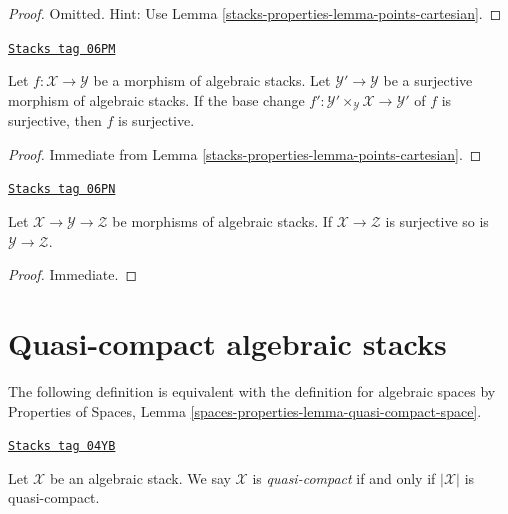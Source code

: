 \begin{proof}
Omitted. Hint: Use
Lemma \ref{stacks-properties-lemma-points-cartesian}.
\end{proof}

\begin{lemma}
\label{stacks-properties-lemma-descent-surjective}
\href{https://stacks.math.columbia.edu/tag/06PM}{\texttt{Stacks tag 06PM}}

Let $f : \mathcal{X} \to \mathcal{Y}$ be a morphism of algebraic stacks.
Let $\mathcal{Y}' \to \mathcal{Y}$ be a surjective morphism of algebraic
stacks. If the base change $f' : \mathcal{Y}' \times_\mathcal{Y} \mathcal{X}
\to \mathcal{Y}'$ of $f$ is surjective, then $f$ is surjective.
\end{lemma}

\begin{proof}
Immediate from
Lemma \ref{stacks-properties-lemma-points-cartesian}.
\end{proof}

\begin{lemma}
\label{stacks-properties-lemma-surjective-permanence}
\href{https://stacks.math.columbia.edu/tag/06PN}{\texttt{Stacks tag 06PN}}

Let $\mathcal{X} \to \mathcal{Y} \to \mathcal{Z}$ be morphisms of
algebraic stacks. If $\mathcal{X} \to \mathcal{Z}$ is surjective
so is $\mathcal{Y} \to \mathcal{Z}$.
\end{lemma}

\begin{proof}
Immediate.
\end{proof}

\section{Quasi-compact algebraic stacks}
\label{stacks-properties-section-quasi-compact}
The following definition is equivalent with the definition for algebraic
spaces by
Properties of Spaces, Lemma \ref{spaces-properties-lemma-quasi-compact-space}.

\begin{definition}
\label{stacks-properties-definition-quasi-compact}
\href{https://stacks.math.columbia.edu/tag/04YB}{\texttt{Stacks tag 04YB}}

Let $\mathcal{X}$ be an algebraic stack.
We say $\mathcal{X}$ is {\it quasi-compact}
if and only if $|\mathcal{X}|$ is quasi-compact.
\end{definition}

